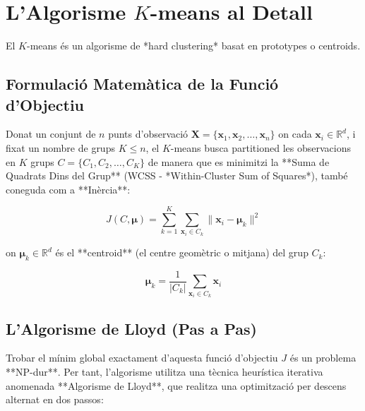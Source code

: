 \documentclass[11pt, a4paper]{article}
\begin{document}
\section{L'Algorisme $K$-means al Detall}

El $K$-means és un algorisme de *hard clustering* basat en prototypes o centroids.

\subsection{Formulació Matemàtica de la Funció d'Objectiu}
Donat un conjunt de $n$ punts d'observació $\mathbf{X} = \{\mathbf{x}_1, \mathbf{x}_2, \dots, \mathbf{x}_n\}$ on cada $\mathbf{x}_i \in \mathbb{R}^d$, i fixat un nombre de grups $K \le n$, el $K$-means busca partitioned les observacions en $K$ grups $C = \{C_1, C_2, \dots, C_K\}$ de manera que es minimitzi la **Suma de Quadrats Dins del Grup** (WCSS - *Within-Cluster Sum of Squares*), també coneguda com a **Inèrcia**:

\begin{equation}
J(C, \boldsymbol{\mu}) = \sum_{k=1}^{K} \sum_{\mathbf{x}_i \in C_k} \lVert \mathbf{x}_i - \boldsymbol{\mu}_k \rVert^2
\end{equation}

on $\boldsymbol{\mu}_k \in \mathbb{R}^d$ és el **centroid** (el centre geomètric o mitjana) del grup $C_k$:

\begin{equation}
\boldsymbol{\mu}_k = \frac{1}{|C_k|} \sum_{\mathbf{x}_i \in C_k} \mathbf{x}_i
\end{equation}

\subsection{L'Algorisme de Lloyd (Pas a Pas)}
Trobar el mínim global exactament d'aquesta funció d'objectiu $J$ és un problema **NP-dur**. Per tant, l'algorisme utilitza una tècnica heurística iterativa anomenada **Algorisme de Lloyd**, que realitza una optimització per descens alternat en dos passos:
\end{document}
